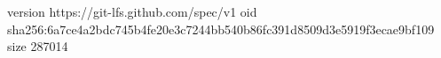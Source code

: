 version https://git-lfs.github.com/spec/v1
oid sha256:6a7ce4a2bdc745b4fe20e3c7244bb540b86fc391d8509d3e5919f3ecae9bf109
size 287014
